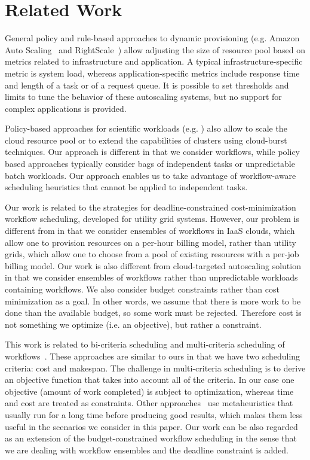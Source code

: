 \documentclass[conference]{IEEEtran}
\begin{document}
\section{Related Work}
\label{sec:related}
General policy and rule-based approaches to dynamic provisioning (e.g. Amazon
Auto Scaling~\cite{Autoscaling} and
RightScale~\cite{RightScale}) allow adjusting the size
of resource pool based on metrics related to infrastructure and application.
A typical infrastruc\-ture-specific metric is system load, whereas
application-speci\-fic metrics include response time and length of a task or
of a request queue. It is possible to set thresholds and limits to tune the behavior
of these autoscaling systems, but no support for complex applications is provided.

Policy-based approaches for scientific workloads (e.g. \cite{Marshall2010,
Kim2011}) also allow to scale the cloud resource pool or to extend the
capabilities of clusters using cloud-burst techniques. Our approach is different
in that we consider workflows, while policy based approaches typically consider
bags of independent tasks or unpredictable batch workloads. Our approach enables us to
take advantage of workflow-aware scheduling heuristics that cannot be applied to
independent tasks.


Our work is related to the strategies for deadline-con\-strained
cost-minimization workflow scheduling, developed for utility grid systems. However, our problem is
different from \cite{Yu2005, Abrishami2010} in that we consider ensembles of workflows in
IaaS clouds, which allow one to provision resources on a per-hour billing model,
rather than utility grids, which allow one to choose from a pool of existing
resources with a per-job billing model. Our work is also different from
cloud-targeted autoscaling solution~\cite{Mao2011} in that we consider ensembles
of workflows rather than unpredictable workloads containing workflows. We also consider budget constraints
rather than cost minimization as a goal. In other words, we assume that there is
more work to be done than the available budget, so some work must be rejected.
Therefore cost is not something we optimize (i.e. an objective), but rather a constraint.


This work is related to bi-criteria scheduling and multi-criteria scheduling of
workflows~\cite{Wieczorek2009,Prodan2010,Dongarra2007}. These approaches are
similar to ours in that we have two scheduling criteria: cost and makespan. The
challenge in multi-criteria scheduling is to derive an objective function that
takes into account all of the criteria. In our case one objective (amount
of work completed) is subject to optimization, whereas time and cost are
treated as constraints. Other approaches~\cite{Talukder2009,Pandey2010} use
metaheuristics that usually run for a long time before producing good results,
which makes them less useful in the scenarios we consider in this paper. Our work can be also
regarded as an extension of the budget-constrained workflow scheduling
\cite{Sakellariou2007} in the sense that we are dealing with workflow ensembles
and the deadline constraint is added.
\end{document}
